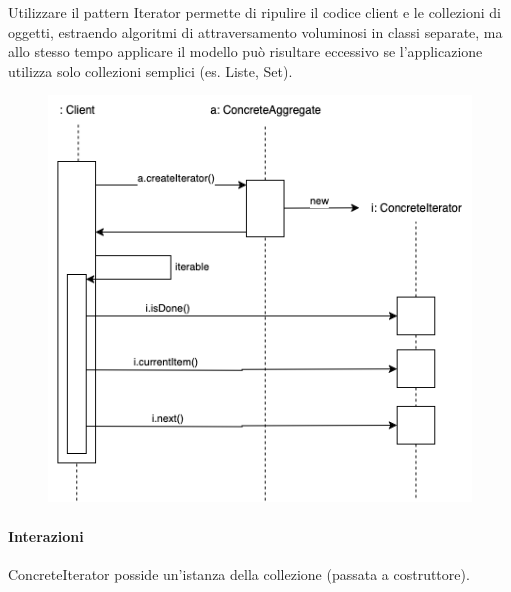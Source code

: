 Utilizzare il pattern Iterator permette di ripulire il codice client e le collezioni di oggetti, estraendo algoritmi di attraversamento voluminosi in classi separate, ma allo stesso tempo applicare il modello può risultare eccessivo se l'applicazione utilizza solo collezioni semplici (es. Liste, Set).

\begin{figure}[H]
    \centering
    \includegraphics[width=1\linewidth]{assets/pattern/iterator/iterator-sequence.drawio.png}
\end{figure}

\paragraph{Interazioni} ConcreteIterator posside un'istanza della collezione (passata a costruttore).

\newpage